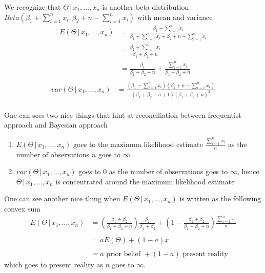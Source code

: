 \documentclass[14pt, reqno]{amsart}
\theoremstyle{definition}
\begin{document}
We recognize that $\Theta \,|\, x_1, \dots, x_n$ is another beta distribution $Beta(\beta_1 + \sum \limits _{i=1}^n x_i, \beta_2  + n - \sum \limits _{i=1}^n x_i)$ with mean and variance
\begin{align*}
E(\Theta \,|\, x_1, \dots, x_n) & =  \frac{\beta_1 + \sum \limits _{i=1}^n x_i}{\beta_1 + \sum \limits _{i=1}^n x_i + \beta_2 + n - \sum \limits _{i=1}^n x_i} \\
 & = \frac{\beta_1 + \sum \limits _{i=1}^n x_i}{\beta_1 + \beta_2 + n} \\
 & = \frac{\beta_1}{\beta_1 + \beta_2 + n} + \frac{\sum \limits _{i=1}^n x_i}{\beta_1 + \beta_2 + n} \\
\end{align*}
\begin{align*}
var(\Theta \,|\, x_1, \dots, x_n) & = \frac{(\beta_1 + \sum \limits _{i=1}^n x_i)(\beta_2 + n - \sum \limits _{i=1}^n x_i)}{(\beta_1 + \beta_2 + n + 1)(\beta_1 + \beta_2 + n)^2} \\
\end{align*}

One can sees two nice things that hint at reconciliation between frequentist approach and Bayesian approach
\begin{enumerate}[1.]
\item $E(\Theta \,|\, x_1, \dots, x_n)$ goes to the maximum likelihood estimate $\frac{\sum \limits _{i=1}^n x_i}{n}$ as the number of observations $n$ goes to $\infty$
\item $var(\Theta \,|\, x_1, \dots, x_n)$ goes to 0 as the number of observations goes to $\infty$, hence $\Theta \,|\, x_1, \dots, x_n$ is concentrated around the maximum likelihood estimate
\end{enumerate}

One can see another nice thing when $E(\Theta \,|\, x_1, \dots, x_n)$ is written as the following convex sum
\begin{align*}
E(\Theta \,|\, x_1, \dots, x_n) & = \left( \frac{\beta_1 + \beta_2}{\beta_1 + \beta_2 + n} \right) \frac{\beta_1}{\beta_1 + \beta_2} + \left( 1 - \frac{\beta_1 + \beta_2}{\beta_1 + \beta_2 + n} \right) \frac{\sum \limits _{i=1}^n x_i}{n} \\
\\
 & = a E(\Theta) + (1 - a) \bar{x} \\
\\
 & =  a \text{ prior belief } + (1 - a)\text{ present reality}
\end{align*}
which goes to present reality as $n$ goes to $\infty$.
\end{document}
